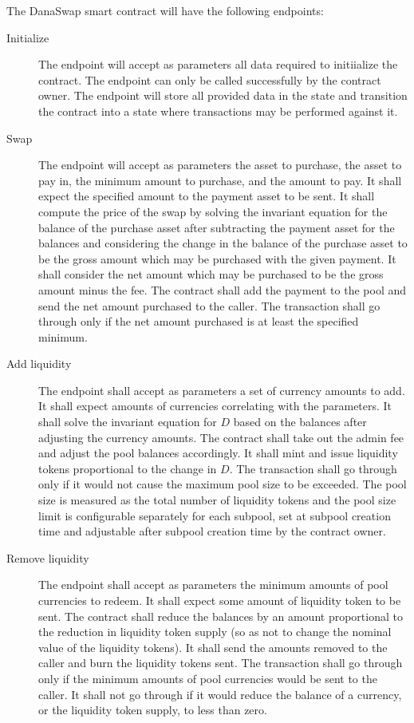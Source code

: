\documentclass[12pt]{article}
\begin{document}
The DanaSwap smart contract will have the following endpoints:

\begin{description}
	\item[Initialize] The endpoint will accept as parameters all data required to initiialize the contract. The endpoint can only be called successfully by the contract owner. The endpoint will store all provided data in the state and transition the contract into a state where transactions may be performed against it.

	\item[Swap] The endpoint will accept as parameters the asset to purchase, the asset to pay in, the minimum amount to purchase, and the amount to pay. It shall expect the specified amount to the payment asset to be sent. It shall compute the price of the swap by solving the invariant equation for the balance of the purchase asset after subtracting the payment asset for the balances and considering the change in the balance of the purchase asset to be the gross amount which may be purchased with the given payment. It shall consider the net amount which may be purchased to be the gross amount minus the fee. The contract shall add the payment to the pool and send the net amount purchased to the caller. The transaction shall go through only if the net amount purchased is at least the specified minimum.

	\item[Add liquidity] The endpoint shall accept as parameters a set of currency amounts to add. It shall expect amounts of currencies correlating with the parameters. It shall solve the invariant equation for $D$ based on the balances after adjusting the currency amounts.  The contract shall take out the admin fee and adjust the pool balances accordingly. It shall mint and issue liquidity tokens proportional to the change in $D$. The transaction shall go through only if it would not cause the maximum pool size to be exceeded. The pool size is measured as the total number of liquidity tokens and the pool size limit is configurable separately for each subpool, set at subpool creation time and adjustable after subpool creation time by the contract owner.

	\item[Remove liquidity] The endpoint shall accept as parameters the minimum amounts of pool currencies to redeem. It shall expect some amount of liquidity token to be sent. The contract shall reduce the balances by an amount proportional to the reduction in liquidity token supply (so as not to change the nominal value of the liquidity tokens). It shall send the amounts removed to the caller and burn the liquidity tokens sent. The transaction shall go through only if the minimum amounts of pool currencies would be sent to the caller. It shall not go through if it would reduce the balance of a currency, or the liquidity token supply, to less than zero.


\end{description}
\end{document}
